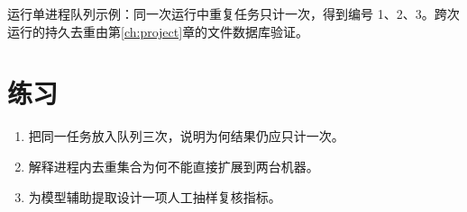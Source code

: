 \begin{tcolorbox}[title=本章验收,colframe=Teal,colback=Teal!3]
运行单进程队列示例：同一次运行中重复任务只计一次，得到编号 1、2、3。跨次运行的持久去重由第\ref{ch:project}章的文件数据库验证。
\end{tcolorbox}

\section{练习}
\begin{enumerate}[label=\arabic*.]
\item 把同一任务放入队列三次，说明为何结果仍应只计一次。
\item 解释进程内去重集合为何不能直接扩展到两台机器。
\item 为模型辅助提取设计一项人工抽样复核指标。
\end{enumerate}


